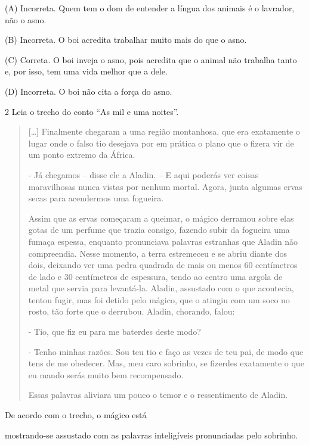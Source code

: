 \begin{esscolha}
\begin{esscolha}
\begin{esscolha}
\begin{esscolha}
\begin{esscolha}
(A) Incorreta. Quem tem o dom de entender a língua dos animais é o
lavrador, não o asno.

(B) Incorreta. O boi acredita trabalhar muito mais do que o asno.

(C) Correta. O boi inveja o asno, pois acredita que o animal não
trabalha tanto e, por isso, tem uma vida melhor que a dele.

(D) Incorreta. O boi não cita a força do asno.

\num{2} Leia o trecho do conto ``As mil e uma noites''.

\begin{quote}
{[}\ldots{}{]} Finalmente chegaram a uma região montanhosa, que era
exatamente o lugar onde o falso tio desejava por em prática o plano que
o fizera vir de um ponto extremo da África.

- Já chegamos -- disse ele a Aladin. -- E aqui poderás ver coisas
maravilhosas nunca vistas por nenhum mortal. Agora, junta algumas ervas
secas para acendermos uma fogueira.

Assim que as ervas começaram a queimar, o mágico derramou sobre elas
gotas de um perfume que trazia consigo, fazendo subir da fogueira uma
fumaça espessa, enquanto pronunciava palavras estranhas que Aladin não
compreendia. Nesse momento, a terra estremeceu e se abriu diante dos
dois, deixando ver uma pedra quadrada de mais ou menos 60 centímetros de
lado e 30 centímetros de espessura, tendo ao centro uma argola de metal
que servia para levantá-la. Aladin, assustado com o que acontecia,
tentou fugir, mas foi detido pelo mágico, que o atingiu com um soco no
rosto, tão forte que o derrubou. Aladin, chorando, falou:

- Tio, que fiz eu para me baterdes deste modo?

- Tenho minhas razões. Sou teu tio e faço as vezes de teu pai, de modo
que tens de me obedecer. Mas, meu caro sobrinho, se fizerdes exatamente
o que eu mando serás muito bem recompensado.

Essas palavras aliviara um pouco o temor e o ressentimento de Aladin.

\end{quote}

De acordo com o trecho, o mágico está

\begin{esscolha}
\item mostrando-se assustado com as palavras inteligíveis pronunciadas pelo sobrinho.


\end{esscolha}
\end{esscolha}
\end{esscolha}
\end{esscolha}
\end{esscolha}
\end{esscolha}
